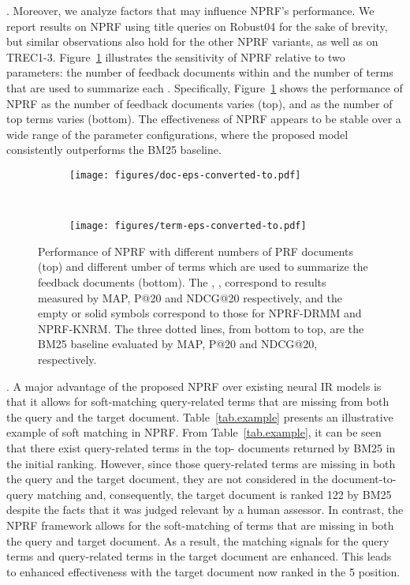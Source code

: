 \documentclass[11pt,a4paper]{article}
\begin{document}
. Moreover, we analyze factors that may influence NPRF's performance. We report results on NPRF using title queries on Robust04 for the sake of brevity, but similar observations also hold for the other NPRF variants, as well as on TREC1-3.
Figure~\ref{fig:param} illustrates the sensitivity of NPRF relative to two parameters: the number of feedback documents  within  and the number of terms  that are used to summarize each . Specifically, Figure~\ref{fig:param} shows the performance of NPRF as the number of feedback documents
 varies (top), and as the number of top terms  varies (bottom). 
The effectiveness of NPRF appears to be stable over a wide range of the parameter configurations, where the proposed model consistently outperforms the BM25 baseline.


\begin{figure}[!htb]
	\centering
	\begin{subfigure}[]{0.5\textwidth}
		\centering
		\texttt{[image: figures/doc-eps-converted-to.pdf]}     
	\end{subfigure}\\ 
	\begin{subfigure}[]{0.5\textwidth}
		\centering
		\texttt{[image: figures/term-eps-converted-to.pdf]}
	\end{subfigure}
	\caption{\small Performance of NPRF with different numbers of PRF documents (top) and different umber of terms which are used to summarize the feedback documents (bottom). The , ,  correspond to results measured by MAP, P@20 and NDCG@20 respectively, and the empty or solid symbols correspond to those for NPRF-DRMM and NPRF-KNRM. The three dotted lines, from bottom to top, are the BM25 baseline evaluated by MAP, P@20 and NDCG@20, respectively.}\label{fig:param}
\end{figure}

. A major advantage of the proposed NPRF over existing neural IR models is that it allows for soft-matching query-related terms that are missing from both the query and the target document. Table~\ref{tab.example} presents an illustrative example of soft matching in NPRF. From Table~\ref{tab.example}, it can be seen that there exist query-related terms in the top- documents returned by BM25 in the initial ranking. However, since those query-related terms are missing in both the query and the target document, they are not considered in the document-to-query matching and, consequently, the target document is ranked 122 by BM25 despite the facts that it was
judged relevant by a human assessor.
In contrast, the NPRF framework allows for the soft-matching of terms that are missing in both the query and target document.
As a result, the matching signals for the query terms and query-related terms in the target document are enhanced. This leads to enhanced effectiveness with the target document now ranked in the 5 position.
\end{document}
